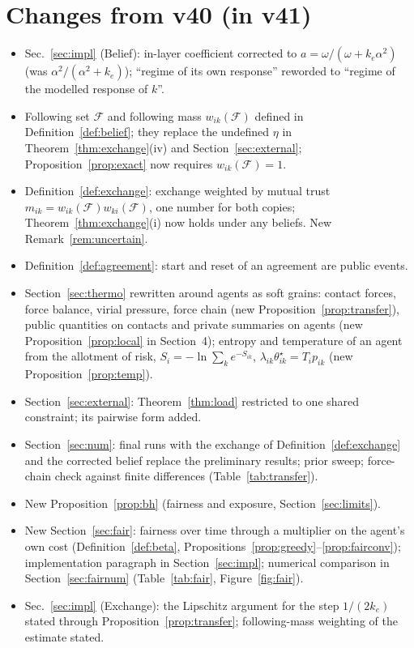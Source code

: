 \documentclass[11pt]{article}
\theoremstyle{definition}
\theoremstyle{remark}
\newcommand{\F}{\mathcal{F}}
\begin{document}
\section*{Changes from v40 (in v41)}
\begin{itemize}
\item Sec.~\ref{sec:impl} (Belief): in-layer coefficient corrected to $a=\omega/(\omega+k_e\alpha^2)$ (was $\alpha^2/(\alpha^2+k_e)$); ``regime of its own response'' reworded to ``regime of the modelled response of $k$''. 
\item Following set $\F$ and following mass $w_{ik}(\F)$ defined in Definition~\ref{def:belief}; they replace the undefined $\eta$ in Theorem~\ref{thm:exchange}(iv) and Section~\ref{sec:external}; Proposition~\ref{prop:exact} now requires $w_{ik}(\F)=1$.
\item Definition~\ref{def:exchange}: exchange weighted by mutual trust $m_{ik}=w_{ik}(\F)w_{ki}(\F)$, one number for both copies; Theorem~\ref{thm:exchange}(i) now holds under any beliefs. New Remark~\ref{rem:uncertain}.
\item Definition~\ref{def:agreement}: start and reset of an agreement are public events.
\item Section~\ref{sec:thermo} rewritten around agents as soft grains: contact forces, force balance, virial pressure, force chain (new Proposition~\ref{prop:transfer}), public quantities on contacts and private summaries on agents (new Proposition~\ref{prop:local} in Section~4); entropy and temperature of an agent from the allotment of risk, $S_i=-\ln\sum_ke^{-S_{ik}}$, $\lambda_{ik}\theta^\star_{ik}=T_ip_{ik}$ (new Proposition~\ref{prop:temp}).
\item Section~\ref{sec:external}: Theorem~\ref{thm:load} restricted to one shared constraint; its pairwise form added.
\item Section~\ref{sec:num}: final runs with the exchange of Definition~\ref{def:exchange} and the corrected belief replace the preliminary results; prior sweep; force-chain check against finite differences (Table~\ref{tab:transfer}).
\item New Proposition~\ref{prop:bh} (fairness and exposure, Section~\ref{sec:limits}).
\item New Section~\ref{sec:fair}: fairness over time through a multiplier on the agent's own cost (Definition~\ref{def:beta}, Propositions~\ref{prop:greedy}--\ref{prop:fairconv}); implementation paragraph in Section~\ref{sec:impl}; numerical comparison in Section~\ref{sec:fairnum} (Table~\ref{tab:fair}, Figure~\ref{fig:fair}).
\item Sec.~\ref{sec:impl} (Exchange): the Lipschitz argument for the step $1/(2k_e)$ stated through Proposition~\ref{prop:transfer}; following-mass weighting of the estimate stated.
\end{itemize}
\end{document}
